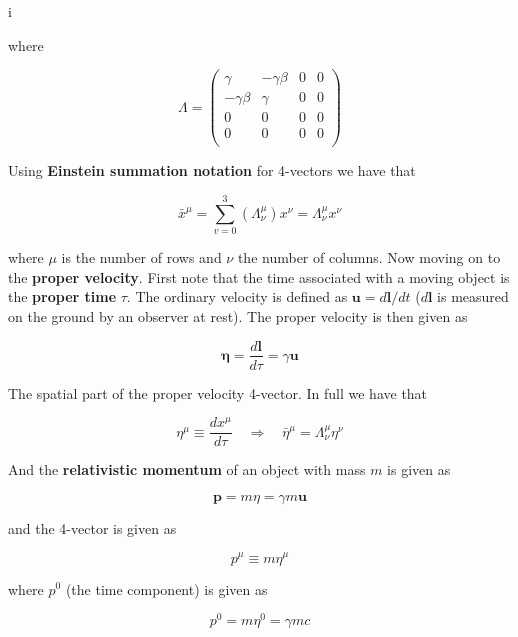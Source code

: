 i\documentclass[a4paper]{article}
\begin{document}
where

\begin{equation*}
    \Lambda
    =
    \begin{pmatrix}
        \gamma & -\gamma\beta & 0 & 0 \\
        -\gamma\beta & \gamma & 0 & 0 \\
        0 & 0 & 0 & 0 \\
        0 & 0 & 0 & 0 \\
    \end{pmatrix}
\end{equation*}

Using \textbf{Einstein summation notation} for 4-vectors we have that

\begin{equation*}
    \bar{x}^\mu=\sum_{v=0}^{3}(\Lambda_\nu^\mu)x^\nu=\Lambda_\nu^\mu x^\nu
\end{equation*}

where $\mu$ is the number of rows and $\nu$ the number of columns. Now moving on to the \textbf{proper velocity}. First note that the time associated with a moving object is the \textbf{proper time} $\tau$. The ordinary velocity is defined as $\bm{u}=d\bm{l}/dt$ ($d\bm{l}$ is measured on the ground by an observer at rest). The proper velocity is then given as 

\begin{equation*}
    \bm{\eta}=\frac{d\bm{l}}{d\tau}=\gamma\bm{u}
\end{equation*}

The spatial part of the proper velocity 4-vector. In full we have that

\begin{equation*}
    \eta^\mu\equiv\frac{dx^\mu}{d\tau}\quad\Rightarrow\quad\bar{\eta}^\mu=\Lambda_\nu^\mu\eta^\nu
\end{equation*}

And the \textbf{relativistic momentum} of an object with mass $m$ is given as

\begin{equation*}
    \bm{p}=m\eta=\gamma m\bm{u}
\end{equation*}

and the 4-vector is given as

\begin{equation*}
    p^\mu\equiv m\eta^\mu
\end{equation*}

where $p^0$ (the time component) is given as

\begin{equation*}
    p^0=m\eta^0=\gamma mc
\end{equation*}
\end{document}

